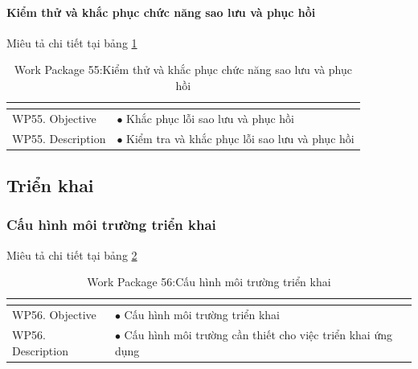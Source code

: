 \documentclass[a4paper]{book}
\begin{document}
\paragraph{Kiểm thử và khắc phục chức năng sao lưu và phục hồi} Miêu tả chi tiết tại bảng \ref{table:kt_kp_saoluuphuchoi}
\begin{table}[h!]
	\begin{center}
		\begin{tabular}{|p{4cm}|p{10cm}|}
			\hline
			\multicolumn{2}{|c|}{\cellcolor[HTML]{363636}{\color[HTML]{FFFFFF}Work package 55: Kiểm thử và khắc phục chức năng sao lưu và phục hồi}}\\
			\hline
			\multirow{1}{*}{WP55. Objective} & $\bullet$ Khắc phục lỗi sao lưu và phục hồi\\
			\hline
			\multirow{1}{*}{WP55. Description} & $\bullet$ Kiểm tra và khắc phục lỗi sao lưu và phục hồi\\
			\hline
		\end{tabular}
		\caption{Work Package 55:Kiểm thử và khắc phục chức năng sao lưu và phục hồi}
		\label{table:kt_kp_saoluuphuchoi}
	\end{center}
\end{table}
\subsection{Triển khai}
\subsubsection{Cấu hình môi trường triển khai} Miêu tả chi tiết tại bảng \ref{table:cauhinh_moitruong_trienkhai}
\begin{table}[h!]
	\begin{center}
		\begin{tabular}{|p{4cm}|p{10cm}|}
			\hline
			\multicolumn{2}{|c|}{\cellcolor[HTML]{363636}{\color[HTML]{FFFFFF}Work package 56: Cấu hình môi trường triển khai}}\\
			\hline
			\multirow{1}{*}{WP56. Objective} & $\bullet$ Cấu hình môi trường triển khai\\
			\hline
			\multirow{1}{*}{WP56. Description} & $\bullet$ Cấu hình môi trường cần thiết cho việc triển khai ứng dụng\\
			\hline
		\end{tabular}
		\caption{Work Package 56:Cấu hình môi trường triển khai}
		\label{table:cauhinh_moitruong_trienkhai}
	\end{center}
\end{table}
\end{document}

